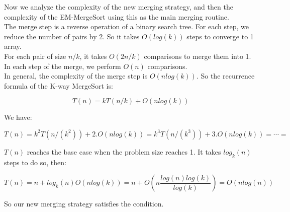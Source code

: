 Now we analyze the complexity of the new merging strategy, and then the complexity of the EM-MergeSort using this as the main merging routine. \\

The merge step is a reverse operation of a binary search tree. For each step, we reduce the number of pairs by 2. So it takes $O(log(k))$ steps to converge to 1 array.\\ 

For each pair of size $n/k$, it takes $O(2n/k)$ comparisons to merge them into 1. In each step of the merge, we perform $O(n)$ comparisons.\\

In general, the complexity of the merge step is $O(nlog(k))$. So the recurrence formula of the K-way MergeSort is:

$$T(n) = kT(n/k) + O(nlog(k))$$

We have:

$$T(n) = k^2 T(n/(k^2)) + 2.O(nlog(k)) = k^3 T(n/(k^3)) + 3.O(nlog(k)) = \cdots = $$

$T(n)$ reaches the base case when the problem size reaches 1. It takes $log_k(n)$ steps to do so, then:

$$T(n) = n + log_k(n) O(nlog(k)) = n + O(n\frac{log(n)log(k)}{log(k)}) = O(nlog(n))$$

So our new merging strategy satisfies the condition.

